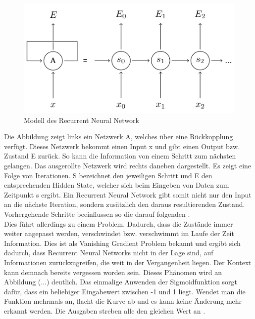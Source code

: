 \begin{figure}[H]
	\centering
	\includegraphics[width=0.8\linewidth]{images/rnn}
	\caption{Modell des Recurrent Neural Network  \cite{GonzalezDominguez.2015}} %
	\label{fig:topology}
\end{figure}

Die Abbildung zeigt links ein Netzwerk A, welches über eine Rückkopplung verfügt. Dieses Netzwerk bekommt einen Input x und gibt einen Output bzw. Zustand E zurück. So kann die Information von einem Schritt zum nächsten gelangen. Das ausgerollte Netzwerk wird rechts daneben dargestellt. Es zeigt eine Folge von Iterationen. S bezeichnet den jeweiligen Schritt und E den entsprechenden Hidden State, welcher sich beim Eingeben von Daten zum Zeitpunkt s ergibt. Ein Recurrent Neural Network gibt somit nicht nur den Input an die nächste Iteration, sondern zusätzlich den daraus resultierenden Zustand. Vorhergehende Schritte beeinflussen so die darauf folgenden {\cite{Yu.2014}}. 
\\
Dies führt allerdings zu einem Problem. Dadurch, dass die Zustände immer weiter angepasst werden, verschwindet bzw. verschwimmt im Laufe der Zeit Information. Dies ist als Vanishing Gradient Problem bekannt und ergibt sich dadurch, dass Recurrent Neural Networks nicht in der Lage sind, auf Informationen zurückzugreifen, die weit in der Vergangenheit liegen. Der Kontext kann demnach bereits vergessen worden sein. Dieses Phänomen wird an Abbildung (...) deutlich. Das einmalige Anwenden der Sigmoidfunktion sorgt dafür, dass ein beliebiger Eingabewert zwischen -1 und 1 liegt. Wendet man die Funktion mehrmals an, flacht die Kurve ab und es kann keine Änderung mehr erkannt werden. Die Ausgaben streben alle den gleichen Wert an {\cite{deeplearning4j}}.


